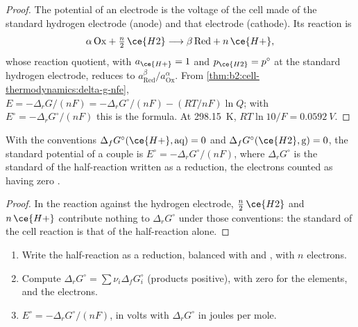 \begin{proof}
The potential of an electrode is the voltage of the cell made of the standard
hydrogen electrode (anode) and that electrode (cathode). Its reaction is
\[
  \alpha\,\mathrm{Ox} + \tfrac n2\,\ce{H2} \longrightarrow \beta\,\mathrm{Red} + n\,\ce{H+} ,
\]
whose reaction quotient, with $a_{\ce{H+}} = 1$ and $p_{\ce{H2}} = p^\circ$ at
the standard hydrogen electrode, reduces to $a_{\mathrm{Red}}^\beta/
a_{\mathrm{Ox}}^\alpha$. From \cref{thm:b2:cell-thermodynamics:delta-g-nfe},
$E = -\Delta_r G/(nF) = -\Delta_r G^\circ/(nF) - (RT/nF)\ln Q$; with $E^\circ =
-\Delta_r G^\circ/(nF)$ this is the formula. At \qty{298.15}{K}, $RT\ln 10/F =
\qty{0.0592}{V}$.
\end{proof}

\begin{proposition}\label{prop:b2:cell-thermodynamics:standard-potential}
With the conventions $\Delta_f G^\circ(\ce{H+}, \text{aq}) = 0$ and
$\Delta_f G^\circ(\ce{H2}, \text{g}) = 0$, the standard potential of a couple is
$E^\circ = -\Delta_r G^\circ/(nF)$, where $\Delta_r G^\circ$ is the standard  of the half-reaction written as a reduction, the electrons counted as
having zero .
\end{proposition}

\begin{proof}
In the reaction against the hydrogen electrode, $\tfrac n2\,\ce{H2}$ and
$n\,\ce{H+}$ contribute nothing to $\Delta_r G^\circ$ under those conventions: the
standard  of the cell reaction is that of the half-reaction alone.
\end{proof}

\begin{method}\label{met:b2:cell-thermodynamics:e-from-gibbs}
\begin{enumerate}
  \item Write the half-reaction as a reduction, balanced with  and
        , with $n$ electrons.
  \item Compute $\Delta_r G^\circ = \sum\nu_i\Delta_f G^\circ_i$ (products
        positive), with zero for the elements,  and the electrons.
  \item $E^\circ = -\Delta_r G^\circ/(nF)$, in volts with $\Delta_r G^\circ$ in
        joules per mole.
\end{enumerate}
\end{method}

